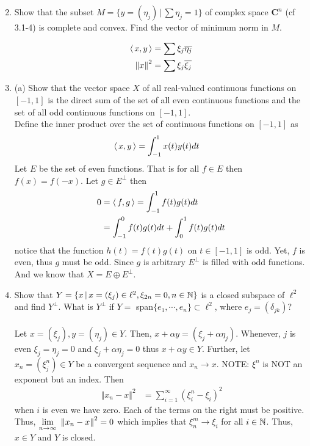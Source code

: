 \documentclass[10pt,a4paper]{report}
\newcommand{\NORM}[1]{\,\left \Vert #1 \right \Vert}
\begin{document}
\begin{enumerate}
	\setcounter{enumi}{1}
	\item Show that the subset $M = \{y =(\eta_j)\,|\, \sum \eta_j = 1\}$ of complex space $\textbf{C}^n$ (cf 3.1-4) is complete and convex.  Find the vector of minimum norm in $M$.
	
	\begin{align*}
		\ABRACKET{x,y} &= \sum \xi_j \CONJ{\eta_j}\\
		\NORM{x}^2 &= \sum \xi_j \CONJ{\xi_j}
	\end{align*}
	
	\item (a) Show that the vector space $X$ of all real-valued continuous functions on $[-1,1]$ is the direct sum of the set of all even continuous functions and the set of all odd continuous functions on $[-1,1]$.\\
	
	Define the inner product over the set of continuous functions on $[-1,1]$ as 
	\begin{align*}
		\left \langle\, x,y \,\right \rangle &= \int_{-1}^1 x(t)y(t) dt 
	\end{align*}Let $E$ be the set of even functions.  That is for all $f \in E$ then $f(x) = f(-x)$. Let $g \in E^\perp$ then
	\begin{align*}
		0 &= \left \langle\, f,g \,\right \rangle = \int_{-1}^1 f(t)g(t) dt\\
		&= \int_{-1}^0 f(t) g(t) dt + \int_{0}^1 f(t)g(t) dt\\
	\end{align*}notice that the function $h(t)=f(t)g(t)$ on $t\in[-1,1]$ is odd.  Yet, $f$ is even, thus $g$ must be odd.  Since $g$ is arbitrary $E^\perp$ is filled with odd functions. And we know that $X = E \oplus E^\perp$.
	
	\setcounter{enumi}{5}
	\item Show that $Y=\{x\,|\, x=(\xi_j)\in \ell^2, \xi_{2n}=0, n\in \mathbb{N}\}$ is a closed subspace of $\ell^2$ and find $Y^\perp$.  What is $Y^\perp$ if $Y=$ span$\{e_1,\cdots,e_n\}\subset \ell^2$, where $e_j = (\delta_{jk})$?\\
	\\
	Let $x = (\xi_j), y = (\eta_j) \in Y$.  Then, $x+\alpha y = (\xi_j + \alpha \eta_j)$.  Whenever, $j$ is even $\xi_j = \eta_j=0$ and $\xi_j + \alpha \eta_j = 0$ thus $x+\alpha y \in Y$. Further, let $x_n = (\xi^n_j) \in Y$ be a convergent sequence and $x_n \to x$.  NOTE: $\xi^n$ is NOT an exponent but an index.  Then
	\begin{align*}
		\NORM{x_n-x}^2 &= \sum_{i=1}^\infty (\xi^n_i-\xi_i)^2
	\end{align*}when $i$ is even we have zero.  Each of the terms on the right must be positive.  Thus, $\LIM{n \to \infty} \NORM{x_n -x}^2 = 0$ which implies that $\xi^m_n \to \xi_i$ for all $i\in \mathbb{N}$. Thus, $x \in Y$ and $Y$ is closed.\\
	\\
	

\end{enumerate}
\end{document}
